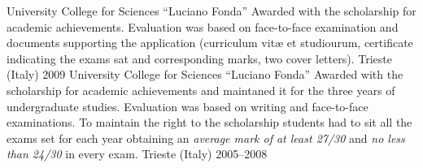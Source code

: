 
\begin{cvhonors}

  \cvhonor
{University College for Sciences ``Luciano Fonda''}
{
   Awarded with the scholarship for academic achievements.
   Evaluation was based on face-to-face examination and documents supporting the
   application (curriculum vit\ae{} et studiourum, certificate indicating the
   exams sat and corresponding marks, two cover letters).}
{Trieste (Italy)}
{2009}
  \cvhonor
{University College for Sciences ``Luciano Fonda''}
{
   Awarded with the scholarship for academic achievements and
   maintaned it
   for the three years of undergraduate studies.
   Evaluation was based on writing and face-to-face
   examinations.
   To maintain the right to the scholarship students had to sit all
   the exams set for each year obtaining 
   an \emph{average mark of at least 27/30} 
   and \emph{no less than 24/30} in every exam.}
{Trieste (Italy)}
{2005--2008}
\end{cvhonors}











